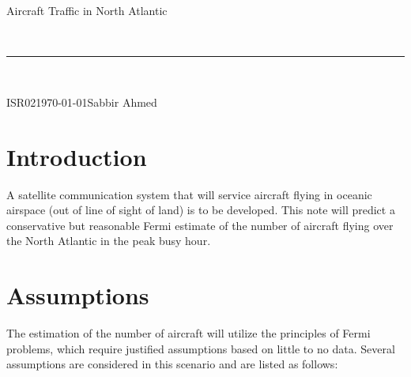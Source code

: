 \documentclass[11pt]{article}
\newcommand{\header}[5]{
	\begin{centering}
		\parbox{6.8in}{
			\begin{flushright}
				\begin{spacing}{.8}{
					\fontfamily{cmss}{\large{\textbf{#1}}\\}}
					\small{
						#2\\
					}
				\end{spacing}
			\end{flushright}
		\vspace{-7.5mm}
		}\\
		\rule{\textwidth}{0.5pt}\\
		\vspace{-4mm}
	\end{centering}
}
\newcommand{\documentinfo}[5]{
	\begin{centering}
		\parbox{6.8in}{
		\begin{spacing}{1}
			\begin{flushleft}
				\begin{tabular}{l l}
					\fontfamily{cmss}{\textbf{DOC \#: }} & #1 \\
					\fontfamily{cmss}{\textbf{DATE: }} & #2 \\
					\fontfamily{cmss}{\textbf{BY: }} & #3 \\
				\end{tabular}\\
				\rule{\textwidth}{1pt}
			\end{flushleft}
		\end{spacing}
		}
	\end{centering}
}
\begin{document}
	\header{CMPE349}{Aircraft Traffic in North Atlantic}{}{}

	\documentinfo{ISR02}{\today}{Sabbir Ahmed}{}

	\section{Introduction}
	A satellite communication system that will service aircraft flying in oceanic airspace (out of line of sight of land) is to be developed. This note will predict a conservative but reasonable Fermi estimate of the number of aircraft flying over the North Atlantic in the peak busy hour.
 
	\section{Assumptions}
	The estimation of the number of aircraft will utilize the principles of Fermi problems, which require justified assumptions based on little to no data. Several assumptions are considered in this scenario and are listed as follows:
\end{document}
